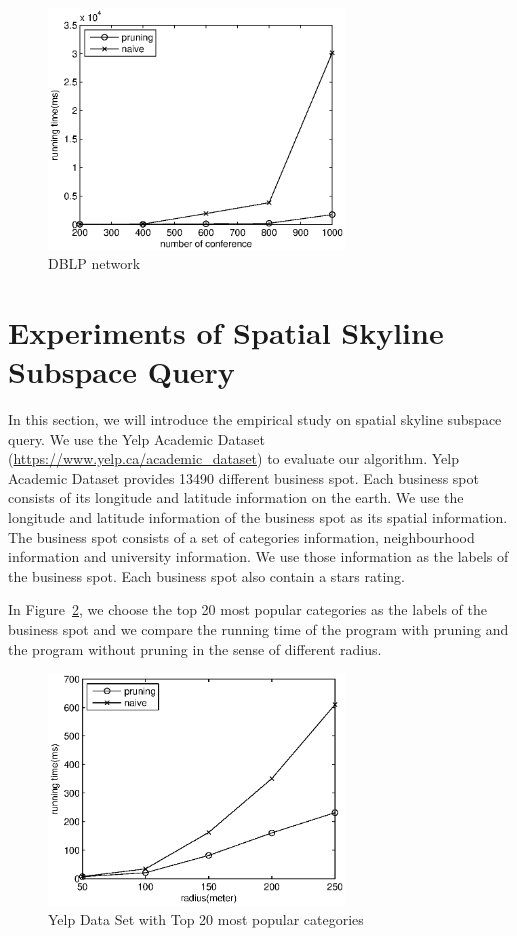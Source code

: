 \begin{figure}[H]
    \centering
      \includegraphics[width=0.7\textwidth]{figs/DBLP}
    \caption{\label{fig:exp:dblp}DBLP network}
\end{figure}

\section{Experiments of Spatial Skyline Subspace Query}
\label{ch:exp:spatial}
In this section, we will introduce the empirical study on spatial skyline subspace query. We use the Yelp Academic Dataset (\url{https://www.yelp.ca/academic_dataset}) to evaluate our algorithm. Yelp Academic Dataset provides 13490 different business spot. Each business spot consists of its longitude and latitude information on the earth. We use the longitude and latitude information of the business spot as its spatial information. The business spot consists of a set of categories information, neighbourhood information and university information. We use those information as the labels of the business spot. Each business spot also contain a stars rating.

In Figure~\ref{fig:exp:yelp20l}, we choose the top 20 most popular categories as the labels of the business spot and we compare the running time of the program with pruning and the program without pruning in the sense of different radius.

\begin{figure}[h]
    \centering
      \includegraphics[width=0.7\textwidth]{figs/YelpTop20Labels}
    \caption{\label{fig:exp:yelp20l}Yelp Data Set with Top 20 most popular categories}
\end{figure}

